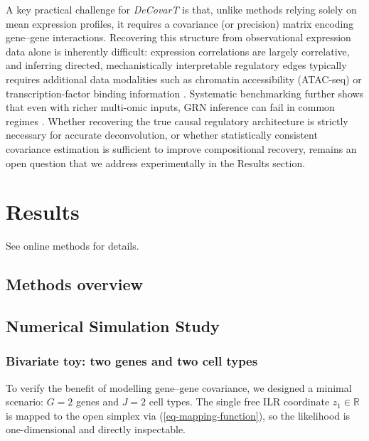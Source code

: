 \documentclass[pdflatex, sn-nature]{sn-jnl}
\theoremstyle{thmstyleone}%
\theoremstyle{thmstyletwo}%
\theoremstyle{thmstylethree}%
\begin{document}
    A key practical challenge for \emph{DeCovarT} is that, unlike methods relying
    solely on mean expression profiles, it requires a covariance (or precision)
    matrix encoding gene--gene interactions.  Recovering this structure from
    observational expression data alone is inherently difficult: expression
    correlations are largely correlative, and inferring directed, mechanistically
    interpretable regulatory edges typically requires additional data modalities
    such as chromatin accessibility (ATAC-seq) or transcription-factor binding
    information \cite{badia-i-mompelGeneRegulatoryNetwork2023,maizelsGeneRegulatoryNetworks2026}.
    Systematic benchmarking further shows that even with richer multi-omic inputs,
    GRN inference can fail in common regimes \cite{nourisaGeneRNIBLivingBenchmark2025}.
    Whether recovering the true causal regulatory architecture is strictly
    necessary for accurate deconvolution, or whether statistically consistent
    covariance estimation is sufficient to improve compositional recovery, remains
    an open question that we address experimentally in the Results section.

    \section{Results}
    \label{sec2}

    See online methods for details.

    \subsection{Methods overview}


    \subsection{Numerical Simulation Study}

    \subsubsection{Bivariate toy: two genes and two cell types}
    \label{sec:bivariate-toy}

    To verify the benefit of modelling gene--gene covariance, we
    designed a minimal scenario: $G=2$ genes and $J=2$ cell types.
    The single free ILR coordinate $z_1\in\mathbb{R}$ is mapped to
    the open simplex via (\ref{eq-mapping-function}), so the likelihood
    is one-dimensional and directly inspectable.
\end{document}
